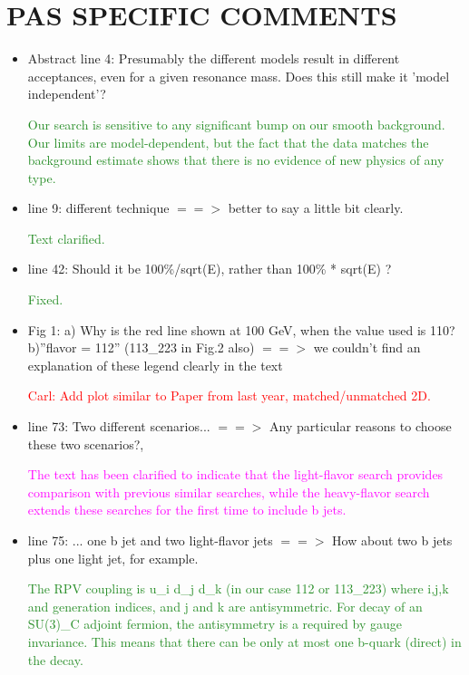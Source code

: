 \documentclass[paper=a4, fontsize=11pt]{scrartcl}
\begin{document}
\section{PAS SPECIFIC COMMENTS}
\begin{itemize}
\item Abstract line 4: Presumably the different models result in different acceptances, even for a given resonance mass. Does this still make it 'model independent'?

\textcolor{ForestGreen}{Our search is sensitive to any significant bump on our
smooth background. Our limits are model-dependent, but the fact that the data
matches the background estimate shows that there is no evidence of new physics
of any type.}\\

\item line 9: different technique $==>$ better to say a little bit clearly.

\textcolor{ForestGreen}{Text clarified.}\\

\item line 42: Should it be 100\%/sqrt(E), rather than 100\% * sqrt(E) ?

\textcolor{ForestGreen}{Fixed.}\\

\item Fig 1: a) Why is the red line shown at 100 GeV, when the value used is 110? b)''flavor = 112'' (113\_223 in Fig.2 also) $==>$ we couldn't find an explanation of these legend clearly in the text

\textcolor{red}{Carl: Add plot similar to Paper from last year, matched/unmatched 2D.}\\

\item line 73: Two different scenarios... $==>$ Any particular reasons to choose these two scenarios?,

\textcolor{magenta}{The text has been clarified to indicate that the
light-flavor search provides comparison with previous similar searches,
while the heavy-flavor search extends these searches for the first time to
include b jets.}\\


\item line 75: ... one b jet and two light-flavor jets $==>$ How about two b jets plus one light jet, for example.

\textcolor{ForestGreen}{The RPV coupling is u\_i d\_j d\_k  (in our case 112 or 113\_223) where i,j,k and
generation indices, and j and k are antisymmetric.
For decay of an SU(3)\_C adjoint fermion, the antisymmetry is a required by gauge invariance.
This means that there can be only at most one b-quark (direct) in the decay.}\\


\end{itemize}
\end{document}
